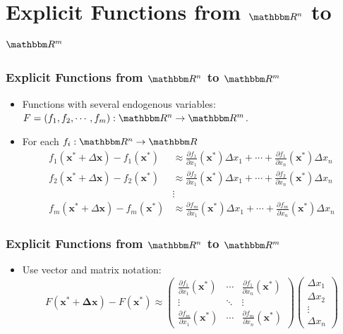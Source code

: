 \documentclass[9pt,aspectratio=169]{beamer}
\newcommand{\RR}{\mathbbm R}
\begin{document}
\section{Explicit Functions from $\RR^n$ to $\RR^m$}
\begin{frame}
	\frametitle{Explicit Functions from $\RR^n$ to $\RR^m$}
    \begin{itemize}
        \item Functions with several endogenous variables: $F =
        (f_1,f_2,\cdots,f_m):\RR^n \to \RR^m$.
        \item For each $f_i: \RR^n\to \RR$
        \small  
        \begin{align*}
            f_1(\mathbf{x^*}+\Delta \mathbf{x})-f_1(\mathbf{x^*}) & \approx
            \frac{\partial f_1}{\partial x_1}(\mathbf{x^*})\Delta x_1+\cdots
            + \frac{\partial f_1}{\partial x_n}(\mathbf{x^*})\Delta x_n  \\ 
            f_2(\mathbf{x^*}+\Delta \mathbf{x})-f_2(\mathbf{x^*}) & \approx
            \frac{\partial f_2}{\partial x_1}(\mathbf{x^*})\Delta x_1+\cdots
            + \frac{\partial f_2}{\partial x_n}(\mathbf{x^*})\Delta x_n  \\ 
            & \vdots  \\
            f_m(\mathbf{x^*}+\Delta \mathbf{x})-f_m(\mathbf{x^*}) & \approx
            \frac{\partial f_m}{\partial x_1}(\mathbf{x^*})\Delta x_1+\cdots
            + \frac{\partial f_m}{\partial x_n}(\mathbf{x^*})\Delta x_n
        \end{align*}

    \end{itemize}
 
\end{frame}

\begin{frame}
	\frametitle{Explicit Functions from $\RR^n$ to $\RR^m$}
    \begin{itemize}
        \item Use vector and matrix notation: 
        \begin{equation*}
            F(\mathbf{x^*+\Delta x})  - F(\mathbf{x^*}) \approx 
             \left(\begin{array}{ccc}
                    \frac{\partial f_1}{\partial x_1}(\mathbf{x^*}) & \cdots & \frac{\partial f_1}{\partial x_n}(\mathbf{x^*}) \\
                    \vdots & \ddots & \vdots \\
                    \frac{\partial f_m}{\partial x_1}(\mathbf{x^*})& \cdots & \frac{\partial f_m}{\partial x_n}(\mathbf{x^*}) 
                \end{array}
            \right) \left(\begin{array}{c}
                    \Delta x_1 \\
                    \Delta x_2 \\
                    \vdots \\ 
                    \Delta x_n 
                \end{array}
            \right) 
        \end{equation*}
    \end{itemize}
\end{frame}
\end{document}
